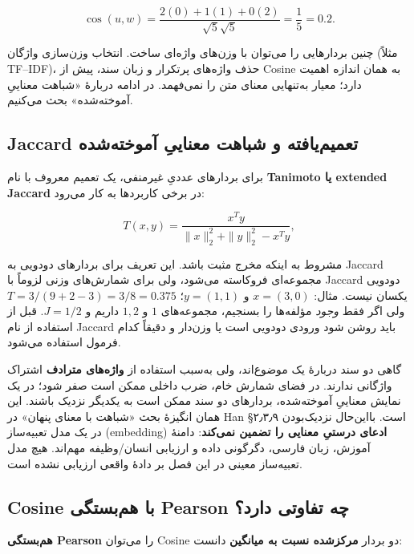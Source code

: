 \documentclass[12pt,a4paper,oneside]{book}
\begin{document}
\[
\cos(u,w)=\frac{2(0)+1(1)+0(2)}{\sqrt5\sqrt5}=\frac15=0.2.
\]

چنین بردارهایی را می‌توان با وزن‌های واژه‌ای ساخت. انتخاب وزن‌سازی واژگان (مثلاً TF--IDF)، حذف واژه‌های پرتکرار و زبان سند، پیش از Cosine به همان اندازه اهمیت دارد؛ معیار به‌تنهایی معنای متن را نمی‌فهمد. در ادامه دربارهٔ «شباهت معناییِ آموخته‌شده» بحث می‌کنیم.

\subsection{Jaccard تعمیم‌یافته و شباهت معناییِ آموخته‌شده}\label{jaccard-ux62aux639ux645ux6ccux645ux6ccux627ux641ux62aux647-ux648-ux634ux628ux627ux647ux62a-ux645ux639ux646ux627ux6ccux6cc-ux622ux645ux648ux62eux62aux647ux634ux62fux647}

برای بردارهای عددیِ غیرمنفی، یک تعمیم معروف با نام \textbf{Tanimoto یا extended Jaccard} در برخی کاربردها به کار می‌رود:

\[
T(x,y)=\frac{x^Ty}{\|x\|_2^2+\|y\|_2^2-x^Ty},
\]

مشروط به اینکه مخرج مثبت باشد. این تعریف برای بردارهای دودویی به Jaccard مجموعه‌ای فروکاسته می‌شود، ولی برای شمارش‌های وزنی لزوماً با Jaccard دودویی یکسان نیست. مثال: \(x=(3,0)\) و \(y=(1,1)\)؛ \(T=3/(9+2-3)=3/8=0.375\) ولی اگر فقط \emph{وجود} مؤلفه‌ها را بسنجیم، مجموعه‌های \({1}\) و \({1,2}\) داریم و \(J=1/2\). قبل از استفاده از نام Jaccard باید روشن شود ورودی دودویی است یا وزن‌دار و دقیقاً کدام فرمول استفاده می‌شود.

گاهی دو سند دربارهٔ یک موضوع‌اند، ولی به‌سبب استفاده از \textbf{واژه‌های مترادف} اشتراک واژگانی ندارند. در فضای شمارش خام، ضرب داخلی ممکن است صفر شود؛ در یک نمایش معناییِ آموخته‌شده، بردارهای دو سند ممکن است به یکدیگر نزدیک باشند. این همان انگیزهٔ بحث «شباهت با معنای پنهان» در Han §۲٫۳٫۹ است. بااین‌حال نزدیک‌بودن در یک مدل تعبیه‌ساز (embedding) \textbf{ادعای درستیِ معنایی را تضمین نمی‌کند}: دامنهٔ آموزش، زبان فارسی، دگرگونی داده و ارزیابی انسان/وظیفه مهم‌اند. هیچ مدل تعبیه‌ساز معینی در این فصل بر دادهٔ واقعی ارزیابی نشده است.

\subsection{Cosine با هم‌بستگی Pearson چه تفاوتی دارد؟}\label{cosine-ux628ux627-ux647ux645ux628ux633ux62aux6afux6cc-pearson-ux686ux647-ux62aux641ux627ux648ux62aux6cc-ux62fux627ux631ux62f}

\textbf{هم‌بستگی Pearson} را می‌توان Cosine دو بردار \textbf{مرکز‌شده نسبت به میانگین} دانست:
\end{document}
